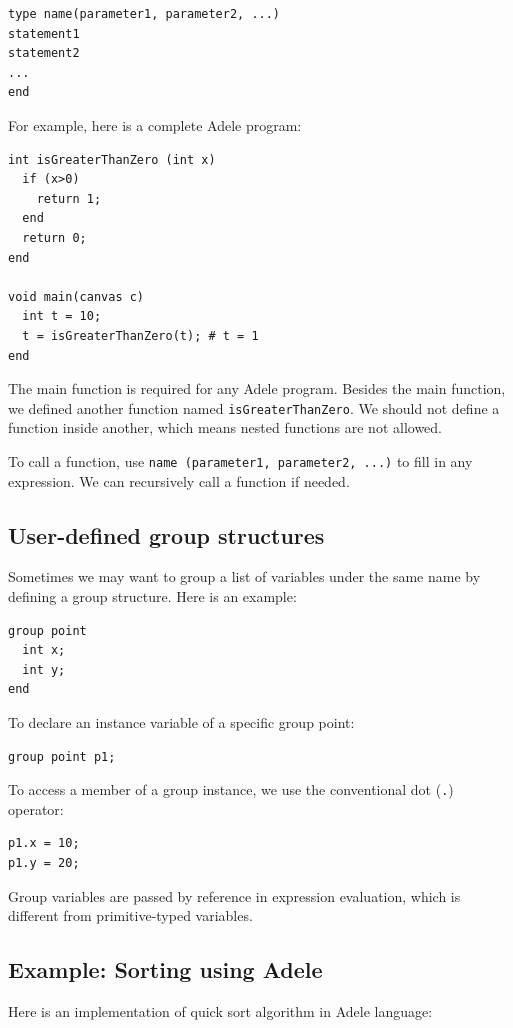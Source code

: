 \documentclass[11pt,letterpaper]{article}
\begin{document}
\begin{lstlisting}
type name(parameter1, parameter2, ...)
statement1
statement2
...
end
\end{lstlisting}

For example, here is a complete Adele program:

\begin{lstlisting}[caption=func.adele, label=func, captionpos=b, tabsize=4, frame=single]
int isGreaterThanZero (int x)
  if (x>0)
    return 1;
  end
  return 0;
end

void main(canvas c)
  int t = 10;
  t = isGreaterThanZero(t); # t = 1
end
\end{lstlisting}

The main function is required for any Adele program. Besides the main function, we defined another function named \texttt{isGreaterThanZero}. We should not define a function inside another, which means nested functions are not allowed.

To call a function, use \texttt{name (parameter1, parameter2, ...)} to fill in any expression. We can recursively call a function if needed.

\subsection {User-defined group structures}
Sometimes we may want to group a list of variables under the same name by defining a group structure. Here is an example:

\begin{lstlisting}
group point
  int x;
  int y;
end
\end{lstlisting}

To declare an instance variable of a specific group point:
\begin{lstlisting}
group point p1;
\end{lstlisting}

To access a member of a group instance, we use the conventional dot (\texttt{.}) operator:
\begin{lstlisting}
p1.x = 10;
p1.y = 20;
\end{lstlisting}

Group variables are passed by reference in expression evaluation, which is different from primitive-typed variables.

\subsection {Example: Sorting using Adele}
Here is an implementation of quick sort algorithm in Adele language:
\end{document}
